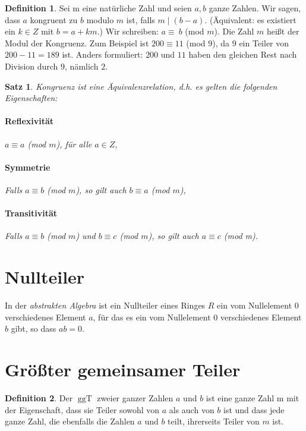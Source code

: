 \documentclass[a4paper,10pt,DIV9, BCOR12mm, oneside,openright,openbib]{scrreprt}
\theoremstyle{definition}
\newtheorem{mydef}{Definition}[section]
\theoremstyle{plain}
\newtheorem{mysat}{Satz}[section]
\begin{document}
\begin{mydef} Sei m eine natürliche Zahl und seien $a, b$ ganze Zahlen. Wir sagen, dass $a$ kongruent zu $b$ modulo $m$ ist, falls $m \mid (b-a)$. (Äquivalent: es existiert ein $k \in Z$ mit $b = a + km$.) Wir schreiben: $a \equiv\ b$ (mod $m$). Die Zahl $m$ heißt der Modul der Kongruenz. Zum Beispiel ist $200 \equiv 11$ (mod $9$), da $9$ ein Teiler von $200-11=189$ ist. Anders formuliert: $200$ und $11$ haben den gleichen Rest nach Division durch $9$, nämlich $2$.
\end{mydef}
\begin{mysat} Kongruenz ist eine Äquivalenzrelation, d.h. es gelten die folgenden Eigenschaften:
\paragraph{Reflexivität} $a \equiv a$ (mod $m$), für alle $a \in Z$,
\paragraph{Symmetrie} Falls $a \equiv b$ (mod $m$), so gilt auch $b \equiv a$ (mod $m$),
\paragraph{Transitivität} Falls $a \equiv b$ (mod $m$) und $b \equiv c$ (mod $m$), so gilt auch $a \equiv c$ (mod m).
\end{mysat}

\section{Nullteiler}
In der \textit{abstrakten Algebra} ist ein Nullteiler eines Ringes $R$ ein vom Nullelement $0$ verschiedenes Element $a$, für das es ein vom Nullelement $0$ verschiedenes Element $b$ gibt, so dass $ab = 0$.

\section{Größter gemeinsamer Teiler}
\begin{mydef}
Der $\operatorname{ggT}$ zweier ganzer Zahlen $a$ und $b$ ist eine ganze Zahl m mit der Eigenschaft, dass sie Teiler sowohl von $a$ als auch von $b$ ist und dass jede ganze Zahl, die ebenfalls die Zahlen $a$ und $b$ teilt, ihrerseits Teiler von $m$ ist. 
\end{mydef}
\end{document}

